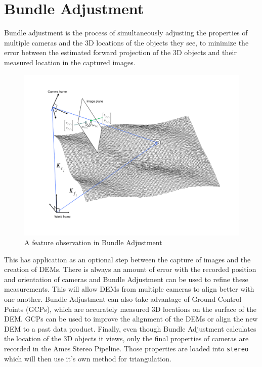 \chapter{Bundle Adjustment}

Bundle adjustment is the process of simultaneously adjusting the
properties of multiple cameras and the 3D locations of the objects
they see, to minimize the error between the estimated forward
projection of the 3D objects and their measured location in the captured
images. 

\begin{figure}[htp]
  \begin{center}
  \includegraphics[trim=20mm 20mm 20mm 15mm,clip,width=6in]{images/ba_feature_observation.pdf}
  \end{center}
  \caption{ A feature observation in Bundle Adjustment \citep{moore09} }
  \label{fig:ba_feature}
\end{figure}

This has application as an optional step between the capture
of images and the creation of DEMs. There is always an amount of error
with the recorded position and orientation of cameras and Bundle
Adjustment can be used to refine these measurements. This will allow
DEMs from multiple cameras to align better with one another. Bundle
Adjustment can also take advantage of Ground Control Points (GCPs),
which are accurately measured 3D locations on the surface of the DEM. GCPs
can be used to improve the alignment of the DEMs or align the new DEM
to a past data product. Finally, even though Bundle Adjustment
calculates the location of the 3D objects it views, only the final
properties of cameras are recorded in the Ames Stereo Pipeline. Those
properties are loaded into \texttt{stereo} which will then use it's own
method for triangulation.

